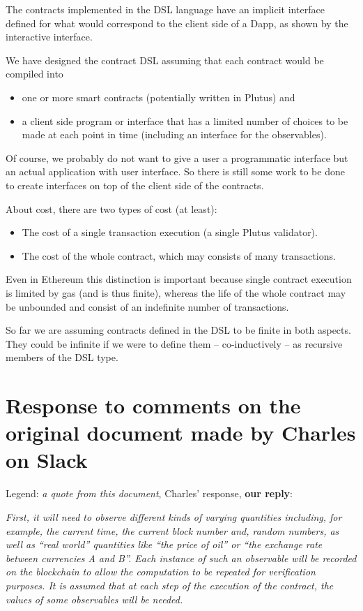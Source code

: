 \documentclass[
      acmsmall
    , screen
    , review=true
  ]{acmart}
\begin{document}
The contracts implemented in the DSL language have an implicit interface defined for what would correspond to the client side of a Dapp, as shown by the interactive interface. 


We have designed the contract DSL assuming that each contract would be compiled into
\begin{itemize} 
\item one or more smart contracts (potentially written in Plutus) and 
\item a client side program or interface that has a limited number of choices to be made at each point in time (including an interface for the observables). 
\end{itemize} 


Of course, we probably do not want to give a user a programmatic interface but an actual application with user interface. So there is still some work to be done to create interfaces on top of the client side of the contracts.


About cost, there are two types of cost (at least):

\begin{itemize} 
\item The cost of a single transaction execution (a single Plutus validator).
\item The cost of the whole contract, which may consists of many transactions.
\end{itemize} 


Even in Ethereum this distinction is important because single contract execution is limited by gas (and is thus finite), whereas the life of the whole contract may be unbounded and consist of an indefinite number of transactions. 


So far we are assuming contracts defined in the DSL to be finite in both aspects. They could be infinite if we were to define them -- co-inductively -- as recursive members of the DSL type.



\section{Response to comments on the original document made by Charles on Slack}

Legend: {\it a quote from this document}, Charles' response, {\bf our reply}:


{\it
First, it will need to observe different kinds of varying quantities including, for example, the current time, the current block number and, random numbers, as well as ``real world'' quantities like ``the price of oil'' or ``the exchange rate between currencies A and B''. Each instance of such an observable will be recorded on the blockchain to allow the computation to be repeated for verification purposes. It is assumed that at each step of the execution of the contract, the values of some observables will be needed.
}
\end{document}
